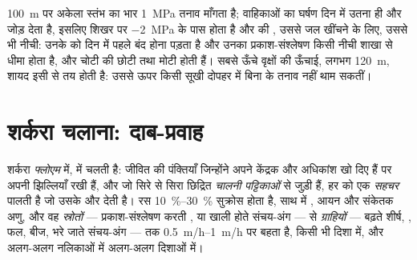 \begin{example}[वृक्ष की चोटी]\label{ex:b1:plant-transport:top}
\qty{100}{m} पर अकेला स्तंभ का भार \qty{1}{MPa} तनाव माँगता है;
वाहिकाओं का घर्षण दिन में उतना ही और जोड़ देता है, इसलिए शिखर पर 
\qty{-2}{MPa} के पास होता है और  की , उससे जल खींचने के
लिए, उससे भी नीची: उनके  को दिन में पहले बंद होना पड़ता है और
उनका प्रकाश-संश्लेषण किसी नीची शाखा से धीमा होता है, और चोटी की 
छोटी तथा मोटी होती हैं। सबसे ऊँचे वृक्षों की ऊँचाई, लगभग \qty{120}{m},
शायद इसी से तय होती है: उससे ऊपर  किसी सूखी दोपहर में बिना
 के तनाव नहीं थाम सकतीं।
\end{example}

\section{शर्करा चलाना: दाब-प्रवाह}

\begin{definition}[फ्लोएम, चालनी नलिकाएँ, स्रोत और ग्राही]\label{def:b1:plant-transport:phloem}
शर्करा \emph{फ्लोएम} में, \emph{} में चलती है: जीवित
 की पंक्तियाँ जिन्होंने अपने केंद्रक और अधिकांश  खो दिए हैं
पर अपनी झिल्लियाँ रखी हैं, और जो सिरे से सिरा छिद्रित \emph{चालनी
पट्टिकाओं} से जुड़ी हैं, हर  को एक \emph{सहचर } पालती है जो
उसके  और  देती है। रस \qtyrange{10}{30}{\%} सुक्रोस होता है,
साथ में , आयन और संकेतक अणु, और वह \emph{स्रोतों} ---
प्रकाश-संश्लेषण करती , या खाली होते संचय-अंग --- से
\emph{ग्राहियों} --- बढ़ते शीर्ष, , फल, बीज, भरे जाते संचय-अंग ---
तक \qtyrange{0.5}{1}{m/h} पर बहता है, किसी भी दिशा में, और अलग-अलग
नलिकाओं में अलग-अलग दिशाओं में।
\end{definition}


